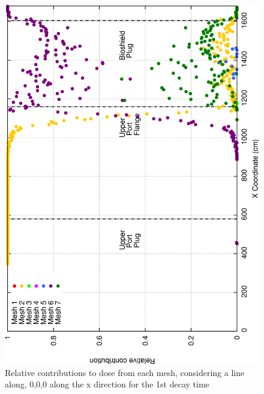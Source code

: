 \documentclass[12pt]{article}
\begin{document}
\begin{figure}[ht!]
\centering
\includegraphics[clip,scale=0.25]{../plots/crosstalk/b4c/up/dc1_rel.png}
\caption{Relative contributions to dose from each mesh, considering a line along, 0,0,0 along the x direction for the 1st decay time}
\label{fig:b4c_ct_up_dc1_rel}
\end{figure}
\end{document}
